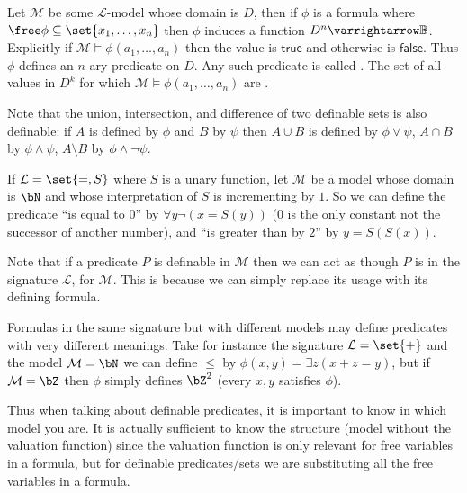 \documentclass[10pt]{article}
\let\to=\varrightarrow
\def\bB{\mathbb{B}}
\def\mL{\mathcal{L}}
\def\mM{\mathcal{M}}
\def\true{\mathsf{true}}
\def\false{\mathsf{false}}
\begin{document}


\bigskip

\begin{defn*}

    Let $\mM$ be some $\mL$-model whose domain is $D$, then if $\phi$ is a formula where $\free\phi\subseteq\set{x_1,\dots,x_n}$ then $\phi$ induces a function $D^n\to\bB$.
    Explicitly if $\mM\vDash\phi(a_1,\dots,a_n)$ then the value is $\true$ and otherwise is $\false$.
    Thus $\phi$ defines an $n$-ary predicate on $D$.
    Any such predicate is called .
    The set of all values in $D^k$ for which $\mM\vDash\phi(a_1,\dots,a_n)$ are .

\end{defn*}

Note that the union, intersection, and difference of two definable sets is also definable: if $A$ is defined by $\phi$ and $B$ by $\psi$ then $A\cup B$ is defined by $\phi\lor\psi$, $A\cap B$ by
$\phi\land\psi$, $A\setminus B$ by $\phi\land\neg\psi$.

\begin{exam*}

    If $\mL=\set{=,S}$ where $S$ is a unary function, let $\mM$ be a model whose domain is $\bN$ and whose interpretation of $S$ is incrementing by $1$.
    So we can define the predicate ``is equal to $0$'' by $\forall y\neg(x=S(y))$ ($0$ is the only constant not the successor of another number), and ``is greater than by $2$'' by $y=S(S(x))$.

\end{exam*}

Note that if a predicate $P$ is definable in $\mM$ then we can act as though $P$ is in the signature $\mL$, for $\mM$.
This is because we can simply replace its usage with its defining formula.

\begin{exam*}

    Formulas in the same signature but with different models may define predicates with very different meanings.
    Take for instance the signature $\mL=\set{+}$ and the model $\mM=\bN$ we can define $\leq$ by $\phi(x,y)=\exists z(x+z=y)$, but if $\mM=\bZ$ then $\phi$ simply defines $\bZ^2$ (every $x,y$ satisfies
    $\phi$).

    Thus when talking about definable predicates, it is important to know in which model you are.
    It is actually sufficient to know the structure (model without the valuation function) since the valuation function is only relevant for free variables in a formula, but for definable predicates/sets
    we are substituting all the free variables in a formula.

\end{exam*}
\end{document}
